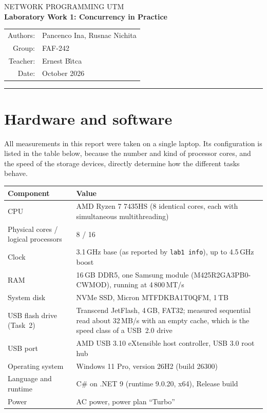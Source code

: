 \documentclass[11pt,a4paper]{article}
\begin{document}
\begin{center}
  {\small NETWORK PROGRAMMING \textperiodcentered{} UTM}\\[6pt]
  {\LARGE\bfseries Laboratory Work 1: Concurrency in Practice}\\[10pt]
  \begin{tabular}{rl}
    Authors: & Pancenco Ina, Rusnac Nichita \\
    Group:   & FAF-242 \\
    Teacher: & Ernest B\^{\i}tca \\
    Date:    & October 2026
  \end{tabular}
\end{center}
\vspace{4pt}\hrule\vspace{8pt}

\section{Hardware and software}

All measurements in this report were taken on a single laptop. Its configuration is listed in the
table below, because the number and kind of processor cores, and the speed of the storage devices,
directly determine how the different tasks behave.

\begin{center}
\small
\begin{tabularx}{\linewidth}{@{}lX@{}}
\toprule
Component & Value \\
\midrule
CPU & AMD Ryzen 7 7435HS (8 identical cores, each with simultaneous multithreading) \\
Physical cores / logical processors & 8 / 16 \\
Clock & 3.1\,GHz base (as reported by \texttt{lab1 info}), up to 4.5\,GHz boost \\
RAM & 16\,GB DDR5, one Samsung module (M425R2GA3PB0-CWMOD), running at 4\,800\,MT/s \\
System disk & NVMe SSD, Micron MTFDKBA1T0QFM, 1\,TB \\
USB flash drive (Task~2) & Transcend JetFlash, 4\,GB, FAT32; measured sequential read about 32\,MB/s
  with an empty cache, which is the speed class of a USB~2.0 drive \\
USB port & AMD USB 3.10 eXtensible host controller, USB 3.0 root hub \\
Operating system & Windows 11 Pro, version 26H2 (build 26300) \\
Language and runtime & C\# on .NET 9 (runtime 9.0.20, x64), Release build \\
Power & AC power, power plan ``Turbo'' \\
\bottomrule
\end{tabularx}
\end{center}
\end{document}
